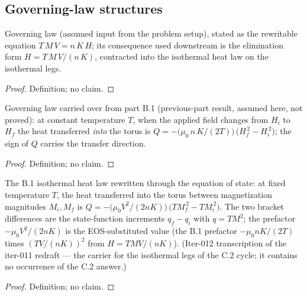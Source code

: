 \subsection*{Governing-law structures}

\begin{definition}
\label{def:IPhO2026Problems_problem_IPhO_2026_3_C_2:EquationOfStateParamagnet}
Governing law (assumed input from the problem setup), stated as the
rewritable equation $T\,M\,V = n\,K\,H$; its consequence used
downstream is the elimination form $H = T\,M\,V/(n\,K)$, contracted
into the isothermal heat law on the isothermal legs.
\end{definition}
\begin{proof}
Definition; no claim.
\end{proof}

\begin{definition}
\label{def:IPhO2026Problems_problem_IPhO_2026_3_C_2:IsothermalHeatIntoTorus}
Governing law carried over from part B.1 (previous-part result,
assumed here, not proved): at constant temperature $T$, when the
applied field changes from $H_i$ to $H_f$ the heat transferred
\emph{into} the torus is
$Q = -\bigl(\mu_0\,n\,K/(2T)\bigr)\,\bigl(H_f^{\,2} - H_i^{\,2}\bigr)$;
the sign of $Q$ carries the transfer direction.
\end{definition}
\begin{proof}
Definition; no claim.
\end{proof}

\begin{definition}
\label{def:IPhO2026Problems_problem_IPhO_2026_3_C_2:IsothermalHeatQForm}
The B.1 isothermal heat law rewritten through the equation of state:
at fixed temperature $T$, the heat transferred into the torus between
magnetization magnitudes $M_i, M_f$ is
$Q = -\bigl(\mu_0 V^2/(2 n K)\bigr)\,\bigl(T M_f^{\,2} - T M_i^{\,2}\bigr)$.
The two bracket differences are the state-function increments
$q_f - q_i$ with $q = T M^2$; the prefactor $-\mu_0 V^2/(2nK)$ is the
EOS-substituted value (the B.1 prefactor $-\mu_0 nK/(2T)$ times
$(TV/(nK))^2$ from $H = TMV/(nK)$).  (Iter-012 transcription of the
iter-011 redraft --- the carrier for the isothermal legs of the C.2
cycle; it contains no occurrence of the C.2 answer.)
\end{definition}
\begin{proof}
Definition; no claim.
\end{proof}

